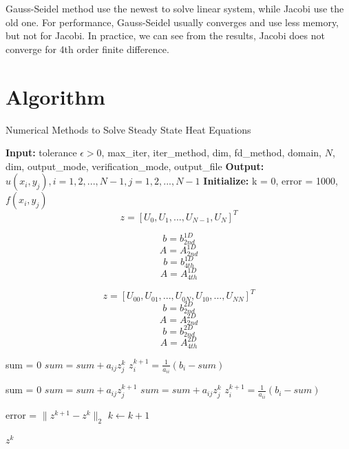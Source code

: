 \documentclass[a4paper]{article}
\begin{document}
Gauss-Seidel method use the newest to solve linear system, while Jacobi use the old one. For performance, Gauss-Seidel usually converges and use less memory, but not for Jacobi. In practice, we can see from the results, Jacobi does not converge for 4th order finite difference.\\

\section{Algorithm}
\begin{algorithm}
\caption{Numerical Methods to Solve Steady State Heat Equations}
    \begin{algorithmic}
    \State \textbf{Input:} tolerance $\epsilon >0$, max\_iter, iter\_method, dim, fd\_method, domain, $N$, dim, output\_mode, verification\_mode, output\_file
    \State \textbf{Output:} $u(x_i,y_j), i = 1,2,...,N-1, j = 1,2,...,N-1$ 
    \State \textbf{Initialize:} k = 0, error = 1000, $f(x_i,y_j)$
            $$z=[U_0, U_1,...,U_{N-1},U_N]^T$$
            
            $$b = b_{2nd}^{1D}$$
            $$A = A_{2nd}^{1D}$$
            \Else
            $$b = b_{4th}^{1D}$$
            $$A = A_{4th}^{1D}$$
            \EndIf
        \EndIf
        
             $$z = [U_{00}, U_{01},...,U_{0N},U_{10},...,U_{NN}]^T$$
            $$b = b_{2nd}^{2D}$$
            $$A = A_{2nd}^{2D}$$
            \Else
            $$b = b_{2nd}^{2D}$$
            $$A = A_{4th}^{2D}$$
            \EndIf
        \EndIf
    
        
        
        sum = 0
        $sum = sum+a_{ij}z_j^k$
        \EndIf
        \EndFor
        $z_i^{k+1} = \frac{1}{a_{ii}}(b_i-sum)$
        \EndFor
        \EndIf
        
        
        sum = 0
        $sum = sum+a_{ij}z_j^{k+1}$
        \EndFor
        $sum = sum+a_{ij}z_j^k$
        \EndFor
        $z_i^{k+1} = \frac{1}{a_{ii}}(b_i-sum)$
        \EndFor
        \EndIf
         
        \State error = $\|z^{k+1}-z^k\|_2$
        \State $k \leftarrow k+1$

        \EndWhile
    \Return $z^k$
    \end{algorithmic}
\end{algorithm}
\end{document}
